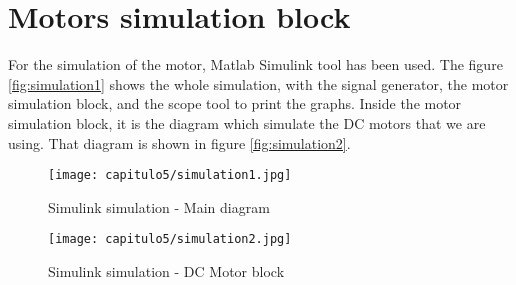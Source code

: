 \section{Motors simulation block}\label{sec:simulation}

For the simulation of the motor, Matlab Simulink tool has been used. The figure \ref{fig:simulation1} shows the whole simulation, with the signal generator, the motor simulation block, and the scope tool to print the graphs. Inside the motor simulation block, it is the diagram which simulate the \acrshort{DC} motors that we are using. That diagram is shown in figure \ref{fig:simulation2}.



\begin{figure}[H]
\centering
		\texttt{[image: capitulo5/simulation1.jpg]}
	\caption{Simulink simulation - Main diagram}
	\label{fig:N6705A}
\end{figure}

\begin{figure}[H]
\centering
		\texttt{[image: capitulo5/simulation2.jpg]}
	\caption{Simulink simulation - \acrshort{DC} Motor block}
	\label{fig:N6705A}
\end{figure}

